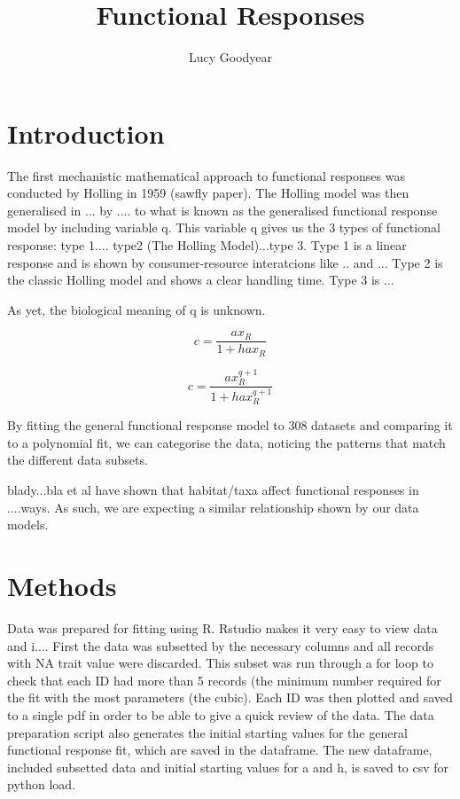 \documentclass[11pt, a4paper, titlepage]{article}
\title{Functional Responses}
\author{Lucy Goodyear}
\date{}
\begin{document}
	\maketitle

\section{Introduction}

The first mechanistic mathematical approach to functional responses was conducted by Holling in 1959 (sawfly paper). The Holling model was then generalised in ... 
by .... to what is known as the generalised functional response model by including variable q. This variable q gives us the 3 types of functional response: 
type 1.... type2 (The Holling Model)...type 3. Type 1 is a linear response and is shown by consumer-resource interatcions like .. and ... 
Type 2 is the classic Holling model and shows a clear handling time. Type 3 is ...

As yet, the biological meaning of q is unknown.

\begin{equation}
    c = \frac{ax_R}{1 + hax_R}
\end{equation}

\begin{equation}
    c = \frac{ax_R^{q + 1}}{1 + hax_R^{q + 1}}
\end{equation}

By fitting the general functional response model to 308 datasets and comparing it to a polynomial fit, we can categorise the data, noticing the patterns
that match the different data subsets. 

blady...bla et al have shown that habitat/taxa affect functional responses in ....ways. As such, we are expecting a similar relationship shown by 
our data models.

\section{Methods}

Data was prepared for fitting using R. Rstudio makes it very easy to view data and i.... First the data was subsetted by the necessary columns and all records with NA trait value were discarded. This subset was run through a for loop to check that each ID had more than 5 records (the minimum number required for the fit with the most parameters (the cubic). Each ID was then plotted and saved to a single pdf in order to be able to give a quick review of the data. The data preparation script also generates the initial starting values for the general functional response fit, which are saved in the dataframe. The new dataframe, included subsetted data and initial starting values for a and h, is saved to csv for python load.
\end{document}

